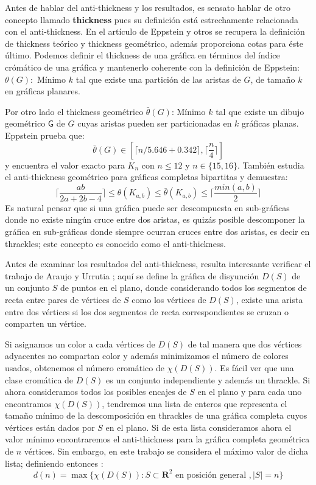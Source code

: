 Antes de hablar del anti-thickness y los resultados, es sensato hablar de otro
concepto llamado \textbf{thickness} pues su definición está estrechamente
relacionada con el anti-thickness. En el artículo de Eppstein y otros
\cite{Dillencourt2004} se recupera la definición de thickness teórico y thickness
geométrico, además proporciona cotas para éste último. Podemos definir el
thickness de una gráfica en términos del índice crómático de una gráfica y
mantenerlo coherente con la definición de Eppstein: $\theta(G):$ Mínimo $k$
tal que existe una partición de las aristas de $G$, de tamaño $k$ en gráficas planares.

Por otro lado el thickness geométrico $\bar{\theta}(G)$: Mínimo $k$ tal que
existe un dibujo geométrico $\mathsf{G}$ de $G$ cuyas aristas pueden ser
particionadas en $k$ gráficas planas. Eppstein prueba que:
\[ \bar{\theta}(G) \in [\lceil n/5.646 + 0.342 \rceil, \lceil\frac{n}{4}\rceil] \]
y encuentra el valor exacto para $K_n$ con $n\leq 12$ y $n\in\{15,16\}$. También
estudia el anti-thickness geométrico para gráficas completas bipartitas y demuestra:
\[
  \lceil \frac{ab}{2a+2b-4} \rceil \leq \theta(K_{a,b}) \leq \bar{\theta}(K_{a,b})
  \leq \lceil \frac{min(a,b)}{2} \rceil
\]
Es natural pensar que si una gráfica puede ser descompuesta en sub-gráficas donde
no existe ningún cruce entre dos aristas, es quizás posible descomponer la
gráfica en sub-gráficas donde siempre ocurran cruces entre dos aristas, es decir
en thrackles; este concepto es conocido como el anti-thickness.

Antes de examinar los resultados del anti-thickness, resulta interesante verificar
el trabajo de Araujo y Urrutia \cite{Araujo2005}; aquí se define la gráfica de
disyunción $D(S)$ de un conjunto $S$ de puntos en el plano, donde considerando
todos los segmentos de recta entre pares de vértices de $S$ como los vértices
de $D(S)$, existe una arista entre dos vértices si los dos segmentos
de recta correspondientes se cruzan o comparten un vértice.

Si asignamos un color a cada vértices de $D(S)$ de tal manera que dos
vértices adyacentes no compartan color y además minimizamos el número de colores
usados, obtenemos el número cromático de $\chi(D(S))$. Es fácil ver que una
clase cromática de $D(S)$ es un conjunto independiente y además un thrackle. Si
ahora consideramos todos los posibles encajes de $S$ en el plano y para cada uno
encontramos $\chi(D(S))$, tendremos una lista de enteros que representa el tamaño
mínimo de la descomposición en thrackles de una gráfica completa cuyos
vértices están dados por $S$ en el plano. Si de esta lista consideramos ahora
el valor mínimo encontraremos el anti-thickness para la gráfica completa geométrica de
$n$ vértices. Sin embargo, en este trabajo se considera el máximo valor de dicha lista;
definiendo entonces :
\[ d(n) = \max\{\chi(D(S)): S \subset \mathbf{R}^2 \text{ en posición general }, |S|=n\}\]

